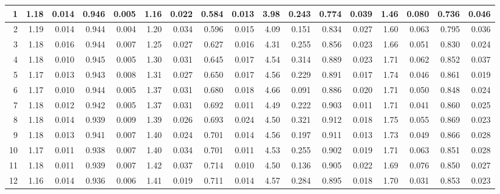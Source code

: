 \documentclass[
]{article}
\begin{document}
\begin{table}[H]
{\begin{tabular}[t]{r|r|r|r|r|r|r|r|r|r|r|r|r|r|r|r|r}
\hline
\hspace{1em}1 & 1.18 & 0.014 & 0.946 & 0.005 & 1.16 & 0.022 & 0.584 & 0.013 & 3.98 & 0.243 & 0.774 & 0.039 & 1.46 & 0.080 & 0.736 & 0.046\\
\hline
\hspace{1em}2 & 1.19 & 0.014 & 0.944 & 0.004 & 1.20 & 0.034 & 0.596 & 0.015 & 4.09 & 0.151 & 0.834 & 0.027 & 1.60 & 0.063 & 0.795 & 0.036\\
\hline
\hspace{1em}3 & 1.18 & 0.016 & 0.944 & 0.007 & 1.25 & 0.027 & 0.627 & 0.016 & 4.31 & 0.255 & 0.856 & 0.023 & 1.66 & 0.051 & 0.830 & 0.024\\
\hline
\hspace{1em}4 & 1.18 & 0.010 & 0.945 & 0.005 & 1.30 & 0.031 & 0.645 & 0.017 & 4.54 & 0.314 & 0.889 & 0.023 & 1.71 & 0.062 & 0.852 & 0.037\\
\hline
\hspace{1em}5 & 1.17 & 0.013 & 0.943 & 0.008 & 1.31 & 0.027 & 0.650 & 0.017 & 4.56 & 0.229 & 0.891 & 0.017 & 1.74 & 0.046 & 0.861 & 0.019\\
\hline
\hspace{1em}6 & 1.17 & 0.010 & 0.944 & 0.005 & 1.37 & 0.031 & 0.680 & 0.018 & 4.66 & 0.091 & 0.886 & 0.020 & 1.71 & 0.050 & 0.848 & 0.024\\
\hline
\hspace{1em}7 & 1.18 & 0.012 & 0.942 & 0.005 & 1.37 & 0.031 & 0.692 & 0.011 & 4.49 & 0.222 & 0.903 & 0.011 & 1.71 & 0.041 & 0.860 & 0.025\\
\hline
\hspace{1em}8 & 1.18 & 0.014 & 0.939 & 0.009 & 1.39 & 0.026 & 0.693 & 0.024 & 4.50 & 0.321 & 0.912 & 0.018 & 1.75 & 0.055 & 0.869 & 0.023\\
\hline
\hspace{1em}9 & 1.18 & 0.013 & 0.941 & 0.007 & 1.40 & 0.024 & 0.701 & 0.014 & 4.56 & 0.197 & 0.911 & 0.013 & 1.73 & 0.049 & 0.866 & 0.028\\
\hline
\hspace{1em}10 & 1.17 & 0.011 & 0.938 & 0.007 & 1.40 & 0.034 & 0.701 & 0.011 & 4.53 & 0.255 & 0.902 & 0.019 & 1.71 & 0.063 & 0.851 & 0.028\\
\hline
\hspace{1em}11 & 1.18 & 0.011 & 0.939 & 0.007 & 1.42 & 0.037 & 0.714 & 0.010 & 4.50 & 0.136 & 0.905 & 0.022 & 1.69 & 0.076 & 0.850 & 0.027\\
\hline
\hspace{1em}12 & 1.16 & 0.014 & 0.936 & 0.006 & 1.41 & 0.019 & 0.711 & 0.014 & 4.57 & 0.284 & 0.895 & 0.018 & 1.70 & 0.031 & 0.853 & 0.023\\

\end{tabular}}
\end{table}
\end{document}
